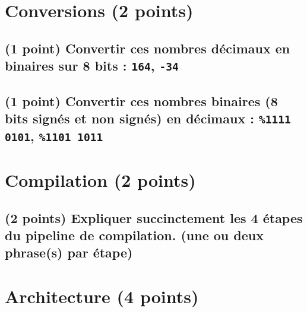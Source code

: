\documentclass[11pt,a4paper]{article}
\author{Fabrice BOISSIER}
\begin{document}
\setlength{\fboxrule}{2pt}

\noindent {}



%


\section{Conversions (2 points)} %

\subsection{(1 point) Convertir ces nombres décimaux en binaires sur 8 bits : \texttt{164}, \texttt{-34}}

\bigskip

\subsection{(1 point) Convertir ces nombres binaires (8 bits signés et non signés) en décimaux : \texttt{\%1111 0101}, \texttt{\%1101 1011}}

\bigskip
\bigskip
\bigskip

\section{Compilation (2 points)} %

\subsection{(2 points) Expliquer succinctement les 4 étapes du pipeline de compilation. (une ou deux phrase(s) par étape)}

\bigskip
\bigskip
\bigskip

\section{Architecture (4 points)} %
\end{document}

